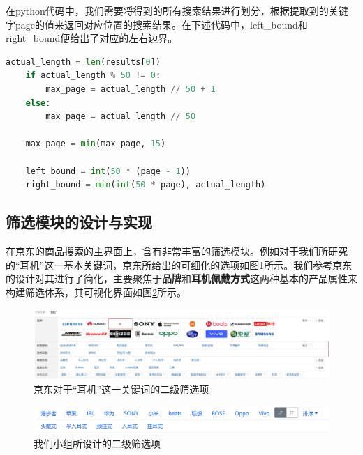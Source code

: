 \documentclass[a4paper,12pt]{article}
\begin{document}
\begin{itemize}
    在python代码中，我们需要将得到的所有搜索结果进行划分，根据提取到的关键字page的值来返回对应位置的搜索结果。在下述代码中，left\_bound和right\_bound便给出了对应的左右边界。

    \begin{lstlisting}[language=Python]
    actual_length = len(results[0])
    if actual_length % 50 != 0:
        max_page = actual_length // 50 + 1
    else:
        max_page = actual_length // 50
        
    max_page = min(max_page, 15)
    
    left_bound = int(50 * (page - 1))
    right_bound = min(int(50 * page), actual_length)
    \end{lstlisting}

    \end{itemize}
    
    

    \subsection{筛选模块的设计与实现}

    在京东的商品搜索的主界面上，含有非常丰富的筛选模块。例如对于我们所研究的“耳机”这一基本关键词，京东所给出的可细化的选项如图\ref{fig:5}所示。我们参考京东的设计对其进行了简化，主要聚焦于\textbf{品牌}和\textbf{耳机佩戴方式}这两种基本的产品属性来构建筛选体系，其可视化界面如图\ref{fig:6}所示。

    \begin{figure}[H]
        \centering
        \includegraphics[scale=0.4]{pic/pic5.png}
        \caption{京东对于“耳机”这一关键词的二级筛选项}
        \label{fig:5}
    \end{figure}

    \begin{figure}[H]
        \centering
        \includegraphics[scale=0.6]{pic/pic6.png}
        \caption{我们小组所设计的二级筛选项}
        \label{fig:6}
    \end{figure}
\end{document}
